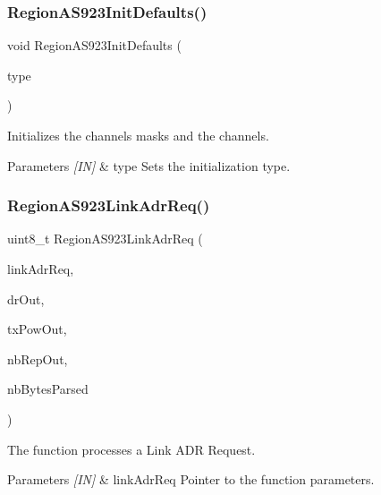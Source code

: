 \subsubsection{\texorpdfstring{Region\+A\+S923\+Init\+Defaults()}{RegionAS923InitDefaults()}}
{\footnotesize\ttfamily void Region\+A\+S923\+Init\+Defaults (\begin{DoxyParamCaption}\item[{\hyperlink{group__REGION_gaddc73ae10673ec925724e7870363bda9}{Init\+Type\+\_\+t}}]{type }\end{DoxyParamCaption})}



Initializes the channels masks and the channels. 


\begin{DoxyParams}{Parameters}
{\em \mbox{[}\+I\+N\mbox{]}} & type Sets the initialization type. \\
\hline
\end{DoxyParams}
\mbox{\label{group__REGIONAS923_ga154ccc00c27ca878e07cfeab3716523a}} 
\subsubsection{\texorpdfstring{Region\+A\+S923\+Link\+Adr\+Req()}{RegionAS923LinkAdrReq()}}
{\footnotesize\ttfamily uint8\+\_\+t Region\+A\+S923\+Link\+Adr\+Req (\begin{DoxyParamCaption}\item[{\hyperlink{group__REGION_gad4af503e8d4de1846129e26a799a1e8e}{Link\+Adr\+Req\+Params\+\_\+t} $\ast$}]{link\+Adr\+Req,  }\item[{int8\+\_\+t $\ast$}]{dr\+Out,  }\item[{int8\+\_\+t $\ast$}]{tx\+Pow\+Out,  }\item[{uint8\+\_\+t $\ast$}]{nb\+Rep\+Out,  }\item[{uint8\+\_\+t $\ast$}]{nb\+Bytes\+Parsed }\end{DoxyParamCaption})}



The function processes a Link A\+DR Request. 


\begin{DoxyParams}{Parameters}
{\em \mbox{[}\+I\+N\mbox{]}} & link\+Adr\+Req Pointer to the function parameters.\\
\hline
\end{DoxyParams}


